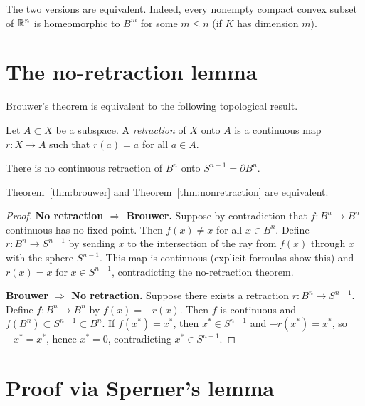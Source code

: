 \begin{remark}
The two versions are equivalent. Indeed, every nonempty compact convex subset of
$\mathbb{R}^n$ is homeomorphic to $B^m$ for some $m \leq n$ (if $K$ has dimension $m$).
\end{remark}

\section{The no-retraction lemma}

Brouwer's theorem is equivalent to the following topological result.

\begin{definition}[Retraction]
Let $A \subset X$ be a subspace. A \emph{retraction} of $X$ onto $A$ is a
continuous map $r : X \to A$ such that $r(a) = a$ for all $a \in A$.
\end{definition}

\begin{theorem}[No retraction]\label{thm:nonretraction}
There is no continuous retraction of $B^n$ onto $S^{n-1} = \partial B^n$.
\end{theorem}

\begin{proposition}
Theorem~\ref{thm:brouwer} and Theorem~\ref{thm:nonretraction} are equivalent.
\end{proposition}

\begin{proof}
\textbf{No retraction $\Rightarrow$ Brouwer.}
Suppose by contradiction that $f : B^n \to B^n$ continuous has no fixed point.
Then $f(x) \neq x$ for all $x \in B^n$. Define $r : B^n \to S^{n-1}$ by
sending $x$ to the intersection of the ray from $f(x)$ through $x$ with the
sphere $S^{n-1}$. This map is continuous (explicit formulas show this) and
$r(x) = x$ for $x \in S^{n-1}$, contradicting the no-retraction theorem.

\textbf{Brouwer $\Rightarrow$ No retraction.}
Suppose there exists a retraction $r : B^n \to S^{n-1}$. Define
$f : B^n \to B^n$ by $f(x) = -r(x)$. Then $f$ is continuous and
$f(B^n) \subset S^{n-1} \subset B^n$. If $f(x^*) = x^*$, then
$x^* \in S^{n-1}$ and $-r(x^*) = x^*$, so $-x^* = x^*$, hence $x^* = 0$,
contradicting $x^* \in S^{n-1}$.
\end{proof}

\section{Proof via Sperner's lemma}

